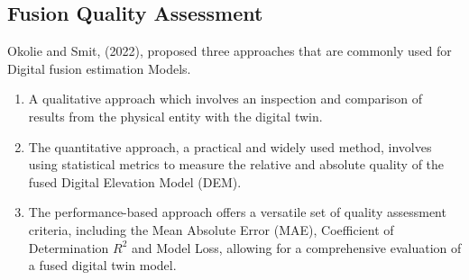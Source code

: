 \subsection{Fusion Quality Assessment}
 Okolie and Smit, (2022), proposed three approaches that are commonly used for Digital fusion estimation Models.
\begin{enumerate}
    \item{A qualitative approach which involves an inspection and comparison of results from the physical entity with the digital twin.}
    \item{The quantitative approach, a practical and widely used method, involves using statistical metrics to measure the relative and absolute quality of the fused Digital Elevation Model (DEM).}
    \item{The performance-based approach offers a versatile set of quality assessment criteria, including the Mean Absolute Error (MAE), Coefficient of Determination \( R^{2} \) and Model Loss, allowing for a comprehensive evaluation of a fused digital twin model.}
\end{enumerate}
